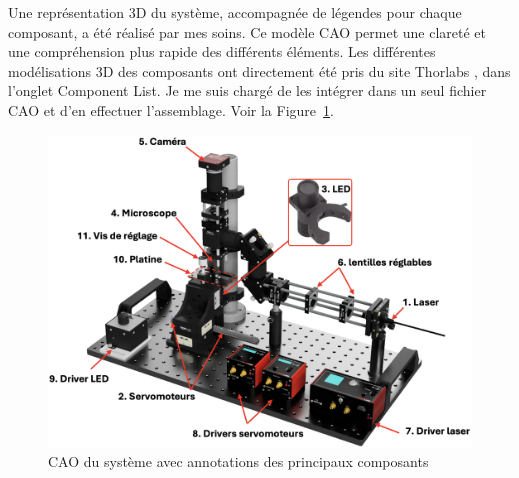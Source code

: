 \newpage
Une représentation 3D du système, accompagnée de légendes pour chaque composant, a été réalisé par mes soins.\label{modelisation_3D} Ce modèle CAO permet une clareté et une compréhension plus rapide des différents éléments. Les différentes modélisations 3D des composants ont directement été pris du site Thorlabs \cite{portableOpticalTweezers}, dans l'onglet \guillemotleft Component List\guillemetright. Je me suis chargé de les intégrer dans un seul fichier CAO et d'en effectuer l'assemblage. Voir la Figure~\ref{kit_CAO_vierge_annote}.

\begin{figure}[H]
    \begin{center}
        \includegraphics[width=\textwidth]{assets/figures/Introduction/Kit_CAO_vierge_annote.png}
    \end{center}
    \caption{CAO du système avec annotations des principaux composants}
    \label{kit_CAO_vierge_annote}
\end{figure}

